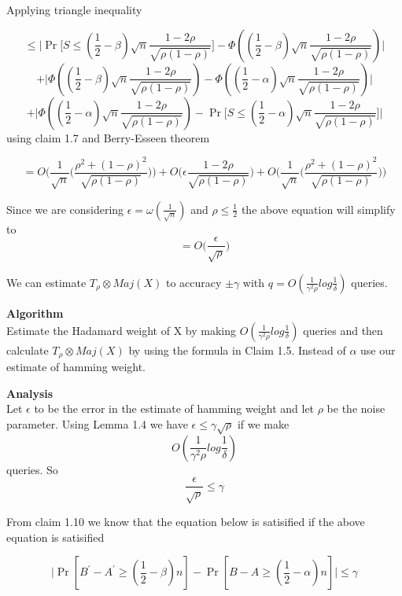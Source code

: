 \documentclass[11pt]{article}
\begin{document}
Applying triangle inequality

$$\leq \Bigg| \Pr\bigg[S \leq (\frac{1}{2} - \beta)\sqrt{n} \frac{1-2\rho}{\sqrt{\rho(1-\rho)}}\bigg] - \Phi((\frac{1}{2} - \beta)\sqrt{n} \frac{1-2\rho}{\sqrt{\rho(1-\rho)}})\Bigg|$$ $$ + \Bigg|\Phi((\frac{1}{2} - \beta)\sqrt{n} \frac{1-2\rho}{\sqrt{\rho(1-\rho)}}) - \Phi((\frac{1}{2} - \alpha)\sqrt{n} \frac{1-2\rho}{\sqrt{\rho(1-\rho)}})\Bigg|$$ $$ + \Bigg|\Phi((\frac{1}{2} - \alpha)\sqrt{n} \frac{1-2\rho}{\sqrt{\rho(1-\rho)}})- \Pr\bigg[S \leq (\frac{1}{2} - \alpha)\sqrt{n} \frac{1-2\rho}{\sqrt{\rho(1-\rho)}}\bigg] \Bigg| $$ using claim 1.7 and Berry-Esseen theorem 

$$= O\Bigg(\frac{1}{\sqrt{n}} \Big( \frac{\rho^2 + (1-\rho)^2}{\sqrt{\rho(1-\rho)}} \Big)\Bigg) + O\Bigg(\epsilon \frac{1-2\rho}{\sqrt{\rho(1-\rho)}}\Bigg) + O\Bigg(\frac{1}{\sqrt{n}} \Big( \frac{\rho^2 + (1-\rho)^2}{\sqrt{\rho(1-\rho)}} \Big)\Bigg) $$

Since we are considering $\epsilon = \omega(\frac{1}{\sqrt{n}})$ and $\rho \leq \frac{1}{2}$ the above equation will simplify to
$$= O\Big(\frac{\epsilon}{\sqrt{\rho}}\Big)$$


\EPF


\BT
We can estimate $T_{\rho} \otimes Maj(X)$ to accuracy $\pm \gamma$ with $q= O(\frac{1}{\gamma^2 \rho}log\frac{1}{\delta})$ queries. 
\ET

\BPF 

\textbf{Algorithm}\\
Estimate the Hadamard weight of X by making  $O(\frac{1}{\gamma^2 \rho}log\frac{1}{\delta})$ queries and then calculate $T_{\rho} \otimes Maj(X)$ by using the formula in Claim 1.5. Instead of $\alpha$ use our estimate of hamming weight. 

\textbf{Analysis}\\
Let $\epsilon$ to be the error in the estimate of hamming weight and let $\rho$ be the noise parameter. Using Lemma 1.4 we have $\epsilon \leq \gamma \sqrt{\rho}$ if we make 
$$O(\frac{1}{\gamma^2 \rho}log\frac{1}{\delta})$$
queries. So $$\frac{\epsilon}{\sqrt{\rho}} \leq \gamma$$

From claim 1.10 we know that the equation below is satisified if the above equation is satisified 

$$ \big| \Pr[B^{'}- A^{'}  \geq (\frac{1}{2} - \beta)n] - \Pr[B-A \geq (\frac{1}{2} - \alpha)n] \big| \leq \gamma$$
\end{document}

